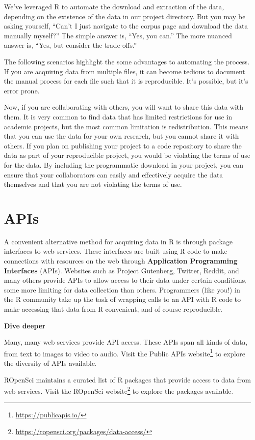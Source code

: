 \documentclass[
  letterpaper,
  krantz1]{latex/krantz-mod}
\theoremstyle{definition}
\theoremstyle{definition}
\theoremstyle{remark}
\DeclareRobustCommand{\href}[2]{#2\footnote{\url{#1}}}
\begin{document}
We've leveraged R to automate the download and extraction of the data,
depending on the existence of the data in our project directory. But you
may be asking yourself, ``Can't I just navigate to the corpus page and
download the data manually myself?'' The simple answer is, ``Yes, you
can.'' The more nuanced answer is, ``Yes, but consider the trade-offs.''

The following scenarios highlight the some advantages to automating the
process. If you are acquiring data from multiple files, it can become
tedious to document the manual process for each file such that it is
reproducible. It's possible, but it's error prone.

Now, if you are collaborating with others, you will want to share this
data with them. It is very common to find data that has limited
restrictions for use in academic projects, but the most common
limitation is redistribution. This means that you can use the data for
your own research, but you cannot share it with others. If you plan on
publishing your project to a code repository to share the data as part
of your reproducible project, you would be violating the terms of use
for the data. By including the programmatic download in your project,
you can ensure that your collaborators can easily and effectively
acquire the data themselves and that you are not violating the terms of
use.

\section{APIs}\label{sec-apis}

A convenient alternative method for acquiring data in R is through
package interfaces to web services. These interfaces are built using R
code to make connections with resources on the web through
\textbf{Application Programming Interfaces} (APIs). Websites such as
Project Gutenberg, Twitter, Reddit, and many others provide APIs to
allow access to their data under certain conditions, some more limiting
for data collection than others. Programmers (like you!) in the R
community take up the task of wrapping calls to an API with R code to
make accessing that data from R convenient, and of course reproducible.

\begin{tcolorbox}[enhanced jigsaw, leftrule=.75mm, colframe=quarto-callout-color-frame, left=2mm, colback=white, toprule=.15mm, breakable, arc=.35mm, opacityback=0, bottomrule=.15mm, rightrule=.15mm]

\textbf{ Dive deeper}

Many, many web services provide API access. These APIs span all kinds of
data, from text to images to video to audio. Visit the
\href{https://publicapis.io/}{Public APIs website} to explore the
diversity of APIs available.

ROpenSci maintains a curated list of R packages that provide access to
data from web services. Visit the
\href{https://ropensci.org/packages/data-access/}{ROpenSci website} to
explore the packages available.

\end{tcolorbox}
\end{document}
